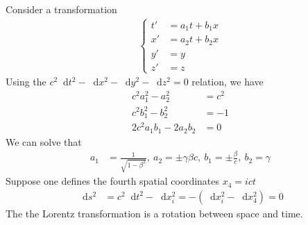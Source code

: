\documentclass[twoside,9pt]{article}
\numberwithin{equation}{section} %
\renewcommand*\d{\mathop{}\!\mathrm{d}}
\theoremstyle{definition}
\theoremstyle{remark}
\begin{document}
Consider a transformation
\begin{align}
    \begin{cases}
        t' &= a_1 t + b_1 x\\
        x' &= a_2 t + b_2 x\\
        y' &= y\\
        z' &= z
    \end{cases}
\end{align}
Using the $c^2\d t^2 - \d x^2 - \d y^2 - \d z^2 = 0$ relation, we have
\begin{align}
    c^2 a_1^2 - a_2^2 &= c^2\\
    c^2 b_1^2 - b_2^2 &= -1\\
    2c^2 a_1b_1 - 2a_2b_2 &= 0
\end{align}
We can solve that
\begin{align}
    a_1 &= \frac{1}{\sqrt{1 - \beta^2}},~
    a_2  = \pm \gamma\beta c,~
    b_1  = \pm \frac{\beta }{c},~
    b_2  = \gamma
\end{align}
Suppose one defines the fourth spatial coordinates $x_4 = ict$
\begin{align}
    \d s^2 &= c^2\d t^2 - \d x_i^2 = -(\d x_i^2 - \d x_4^2) = 0
\end{align}
The the Lorentz transformation is a rotation between space and time.



\end{document}
